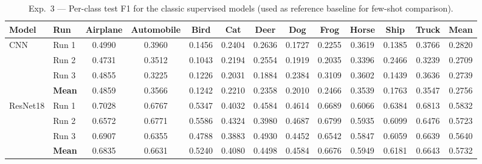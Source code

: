\begin{table}[H]
\centering
\caption{Exp.\ 3 — Per-class test F1 for the classic supervised models (used as reference baseline for few-shot comparison).}
\label{tab:exp3_classic_perclass}
\small
\begin{tabular}{llccccccccccc}
\toprule
\textbf{Model} & \textbf{Run} & \textbf{Airplane} & \textbf{Automobile} & \textbf{Bird} & \textbf{Cat} & \textbf{Deer} & \textbf{Dog} & \textbf{Frog} & \textbf{Horse} & \textbf{Ship} & \textbf{Truck} & \textbf{Mean} \\
\midrule
CNN & Run 1 & 0.4990 & 0.3960 & 0.1456 & 0.2404 & 0.2636 & 0.1727 & 0.2255 & 0.3619 & 0.1385 & 0.3766 & 0.2820 \\
 & Run 2 & 0.4731 & 0.3512 & 0.1043 & 0.2194 & 0.2554 & 0.1919 & 0.2035 & 0.3396 & 0.2466 & 0.3239 & 0.2709 \\
 & Run 3 & 0.4855 & 0.3225 & 0.1226 & 0.2031 & 0.1884 & 0.2384 & 0.3109 & 0.3602 & 0.1439 & 0.3636 & 0.2739 \\
 & \textbf{Mean} & 0.4859 & 0.3566 & 0.1242 & 0.2210 & 0.2358 & 0.2010 & 0.2466 & 0.3539 & 0.1763 & 0.3547 & 0.2756 \\
\midrule
ResNet18 & Run 1 & 0.7028 & 0.6767 & 0.5347 & 0.4032 & 0.4584 & 0.4614 & 0.6689 & 0.6066 & 0.6384 & 0.6813 & 0.5832 \\
 & Run 2 & 0.6572 & 0.6771 & 0.5586 & 0.4324 & 0.3980 & 0.4687 & 0.6799 & 0.5935 & 0.6099 & 0.6476 & 0.5723 \\
 & Run 3 & 0.6907 & 0.6355 & 0.4788 & 0.3883 & 0.4930 & 0.4452 & 0.6542 & 0.5847 & 0.6059 & 0.6639 & 0.5640 \\
 & \textbf{Mean} & 0.6835 & 0.6631 & 0.5240 & 0.4080 & 0.4498 & 0.4584 & 0.6676 & 0.5949 & 0.6181 & 0.6643 & 0.5732 \\
\midrule
\bottomrule
\end{tabular}
\end{table}
